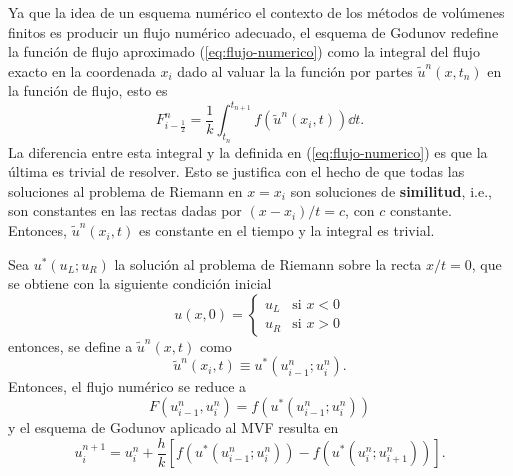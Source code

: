 Ya que la idea de un esquema numérico el contexto de los métodos de volúmenes finitos es producir un flujo numérico adecuado, el esquema de Godunov redefine la función de flujo aproximado (\ref{eq:flujo-numerico}) como la integral del flujo exacto en la coordenada $x_i$ dado al valuar la  la función por partes $\tilde{u}^{n}(x,t_n)$ en la función de flujo, esto es
\begin{equation}
	F_{i-\frac{1}{2}}^{n} = \frac{1}{k}\int_{t_n}^{t_{n+1}}f(\tilde{u}^{n}(x_i,t))\dd{t}.
\end{equation}
La diferencia entre esta integral y la definida en (\ref{eq:flujo-numerico}) es que la última es trivial de resolver. Esto se justifica con el hecho de que todas las soluciones al problema de Riemann en $x=x_{i}$ son soluciones de \textbf{similitud}, i.e., son constantes en las rectas dadas por $(x-x_{i})/t = c$, con $c$ constante. Entonces, $\tilde{u}^{n}(x_{i},t)$ es constante en el tiempo y la integral es trivial.

Sea $u^{*}(u_L; u_R)$ la solución al problema de Riemann sobre la recta $x/t = 0$, que se obtiene con la siguiente condición inicial
\begin{equation}
	u(x,0) = 
	\begin{cases}
		u_L & \text{si } x < 0 \\
		u_R & \text{si } x > 0
	\end{cases}
\end{equation}
entonces, se define a $\tilde{u}^{n}(x,t)$ como
\begin{equation}
	\tilde{u}^{n}(x_{i},t) \equiv u^{*}(u_{i-1}^{n} ; u_{i}^{n}).
\end{equation}
Entonces, el flujo numérico se reduce a
\begin{equation}
	F(u_{i-1}^{n}, u_{i}^{n}) = f(u^{*}(u_{i-1}^{n} ; u_{i}^{n}))
\end{equation}
y el esquema de Godunov aplicado al MVF resulta en
\begin{equation}
	u_{i}^{n+1} = u_{i}^{n} + \frac{h}{k} \left[f(u^{*}(u_{i-1}^{n} ; u_{i}^{n})) - f(u^{*}(u_{i}^{n} ; u_{i+1}^{n}))\right].
\end{equation}

